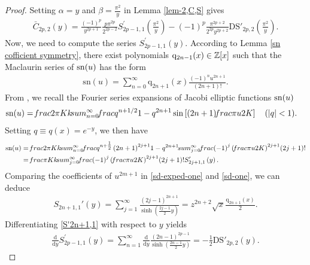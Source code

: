 \documentclass[11pt]{article}
\def\Z{\mathbb{Z}}
\theoremstyle{plain}
\theoremstyle{definition}
\begin{document}
\begin{proof}
Setting $\alpha=y$ and $\beta=\tfrac{\pi ^2}{y}$ in Lemma \ref{lem-2,C,S} gives
\begin{align}\label{equ-lemma3-one}
\bar{C}_{2p,2}\left( y \right) =\frac{\left( -1 \right) ^p}{y^{2p+1}}\frac{p\pi ^{2p}}{2^{2p-2}}S_{2p-1,1}^{\prime}\left( \frac{\pi ^2}{y} \right) -\left( -1 \right) ^p\frac{\pi ^{2p+2}}{2^{2p}y^{2p+2}}\text{DS}'_{2p,2}\left( \frac{\pi ^2}{y} \right).
\end{align}
Now, we need to compute the series $S_{2p-1,1}^{'}\left( y \right)$. According to Lemma \ref{sn cofficient symmetry}, there exist polynomials  ${\rm q}_{2n-1}(x)\in\Z[x]$ such that
the Maclaurin series of ${\rm sn}(u)$ has the form
\begin{align}\label{sd-exped-one}
\mathrm{sn}\left( u \right) =\sum_{n=0}^{\infty}{\mathrm{q}_{2n+1}\left( x \right) \frac{\left( -1 \right) ^nu^{2n+1}}{\left( 2n+1 \right) !}}.
\end{align}	
From \cite{DCLMRT1992}, we recall the Fourier series expansions of Jacobi elliptic functions ${\rm sn}(u)$
\begin{align}\label{sd}
&{\rm sn}(u)=\frac{2\pi}{Kk}\sum_{n=0}^{\infty}\frac{q^{n+1/2}}{1-q^{2n+1}}\sin\left[(2n+1)\frac{\pi u}{2K}\right]\quad (|q|<1).
\end{align}
Setting  $q\equiv q\left( x \right)=e^{-y}$, we then have
\begin{align}\label{sd-one}
{\rm sn}(u)&=\frac{2\pi}{Kk}\sum_{n=0}^{\infty}{\frac{q^{n+\tfrac{1}{2}}\left( 2n+1 \right) ^{2j+1}}{1-q^{2n+1}}}\sum_{j=0}^{\infty}{\frac{\left( -1 \right) ^j\left( \frac{\pi u}{2K} \right) ^{2j+1}}{\left( 2j+1 \right) !}}
	 \nonumber\\
	 &=\frac{\pi}{Kk}\sum_{j=0}^{\infty}{\frac{\left( -1 \right) ^j\left( \frac{\pi u}{2K} \right) ^{2j+1}}{\left( 2j+1 \right) !}}S_{2j+1,1}^{\prime}\left( y \right) .
\end{align}	
Comparing the coefficients of $u^{2m+1}$ in \eqref{sd-exped-one} and \eqref{sd-one}, we can deduce
\begin{align}
S_{2n+1,1}'\left( y \right)=\sum_{j=1}^{\infty}{\frac{\left( 2j-1 \right) ^{2n+1}}{\sinh \left( \frac{2j-1}{2}y \right)}}
=z^{2n+2}\sqrt{x}\frac{\mathrm{q}_{2n+1}\left( x \right)}{2}. \label{S'2n+1,1}
\end{align}
Differentiating \eqref{S'2n+1,1} with respect to $y$ yields
\begin{align*}
\frac{\mathrm{d}}{\mathrm{d}y}S_{2p-1,1}^{\prime}\left( y \right) =\sum_{n=1}^{\infty}{\frac{\mathrm{d}}{\mathrm{d}y}\frac{\left( 2n-1 \right) ^{2p-1}}{\sinh \left( \frac{2n-1}{2}y \right)}=-\frac{1}{2}}\text{DS}'_{2p,2}\left( y \right).

\end{align*}
\end{proof}
\end{document}
